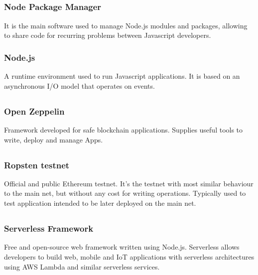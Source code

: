 	\subsection*{}
		\subsubsection*{Node Package Manager}
			It is the main software used to manage Node.js modules and packages, allowing to share code for recurring problems between Javascript developers.
		\subsubsection*{Node.js}
			A runtime environment used to run Javascript applications. It is based on an asynchronous I/O model that operates on events.
	
	\subsection*{}
		\subsubsection*{Open Zeppelin}
			Framework developed for safe blockchain applications. Supplies useful tools to write, deploy and manage \DJ{}Apps.
      
	\subsection*{}
		\subsubsection*{Ropsten testnet}
			Official and public Ethereum testnet. It's the testnet with most similar behaviour to the main net, but without any cost for writing operations. Typically used to test application intended to be later deployed on the main net.
      
	\subsection*{}
		\subsubsection*{Serverless Framework}
			Free and open-source web framework written using Node.js. Serverless allows developers to build web, mobile and IoT applications with serverless architectures using AWS Lambda and similar serverless services.
